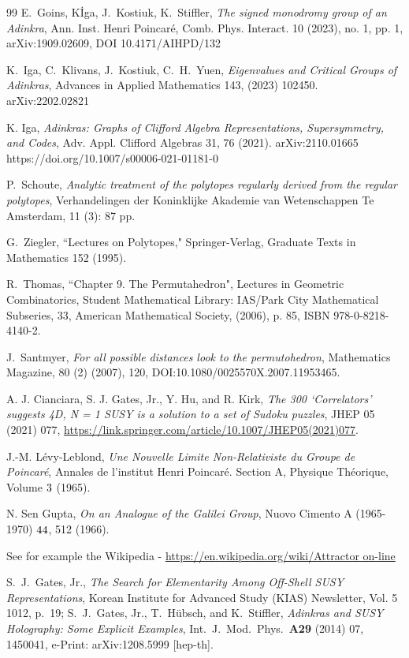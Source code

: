 \documentclass[12pt]{article}
\let\bm\relax
\newcommand{\bm}[1]{{\boldsymbol{#1}}}
\begin{document}
\begin{thebibliography}{99}
E.\ Goins, K\. Iga, J.\ Kostiuk, K.\ Stiffler,  {\em The signed monodromy group of an Adinkra}, Ann. Inst. 
Henri Poincaré, Comb. Phys. Interact. 10 (2023), no. 1,
pp. 1, arXiv:1909.02609, DOI 10.4171/AIHPD/132

K.\ Iga, C.\ Klivans, J.\ Kostiuk, C.\ H.\ Yuen,  {\em Eigenvalues and Critical Groups of Adinkras}, Advances in Applied Mathematics 143, (2023) 102450.  arXiv:2202.02821

K. Iga,  {\em Adinkras: Graphs of Clifford Algebra Representations, Supersymmetry, and Codes}, Adv. Appl. Clifford Algebras 31, 76 (2021). arXiv:2110.01665 https://doi.org/10.1007/s00006-021-01181-0

P.\ Schoute, {\em Analytic treatment of the polytopes regularly derived from the regular polytopes}, Verhandelingen der Koninklijke Akademie van Wetenschappen Te Amsterdam, 11 (3): 87 pp. 

G.\ Ziegler, ``Lectures on Polytopes," Springer-Verlag, Graduate Texts in Mathematics 152  (1995).

R.\ Thomas,  
``Chapter 9. The Permutahedron", Lectures in Geometric Combinatorics, Student Mathematical 
Library: IAS/Park City Mathematical Subseries, 33, American Mathematical Society, (2006), p. 85, 
ISBN 978-0-8218-4140-2.

J.\ Santmyer, {\em For all possible distances look to the permutohedron}, Mathematics Magazine, 
80 (2) (2007), 120, DOI:10.1080/0025570X.2007.11953465.

A. J. Cianciara, S. J. Gates, Jr., Y. Hu, and R. Kirk,
{\em The 300 `Correlators' suggests 4D, N = 1 SUSY is a solution to a 
set of Sudoku puzzles},
JHEP 05 (2021) 077,
\url{https://link.springer.com/article/10.1007/JHEP05(2021)077}.

J.-M.  Lévy-Leblond,
{\em Une Nouvelle Limite Non-Relativiste du Groupe de Poincaré}, Annales de l'institut Henri Poincaré. Section A, Physique Théorique, Volume $\bm 3$ (1965).

N. Sen Gupta, 
{\em On an Analogue of the Galilei Group}, Nuovo Cimento A (1965-1970) $\bm {44}$, 512 (1966).

 See for example the Wikipedia - \url{https://en.wikipedia.org/wiki/Attractor
on-line}

S.\ J.\ Gates, Jr., {\em The Search for Elementarity Among Off-Shell SUSY Representations},
Korean Institute for Advanced Study (KIAS) Newsletter, Vol. 5 1012, p.\ 19; S.\ J.\ Gates, Jr., 
T.\ H\" ubsch, and K.\ Stiffler, {\em Adinkras and SUSY Holography: Some Explicit Examples}, 
Int.\ J.\ Mod.\ Phys.\ {\bf {A29}} (2014) 07, 1450041, e-Print: arXiv:1208.5999 [hep-th].


\end{thebibliography}
\end{document}
